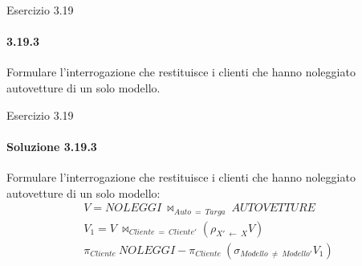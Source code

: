 %
\begin{frame}{Esercizio 3.19}
    \framesubtitle{3.19.3}
    \vspace{-3.cm}
    \vspace{.3cm}

    Formulare l'interrogazione che restituisce i clienti che hanno noleggiato autovetture di un solo modello.
\end{frame}
%
\begin{frame}{Esercizio 3.19}
    \framesubtitle{Soluzione 3.19.3}
    \vspace*{-2cm}
    \vspace{.3cm}

    {\small Formulare l'interrogazione che restituisce i clienti che hanno noleggiato autovetture di un solo modello:}
    \small
    \begin{gather*}
        V = NOLEGGI~\bowtie_{Auto~=~Targa}~AUTOVETTURE\\
        V_{1} = V~\bowtie_{Cliente~=~Cliente'} (\rho_{X'~\leftarrow~X} V)\\
        \pi_{Cliente}~NOLEGGI - \pi_{Cliente}~(\sigma_{Modello~\neq~Modello'} V_1)
    \end{gather*}
\end{frame}